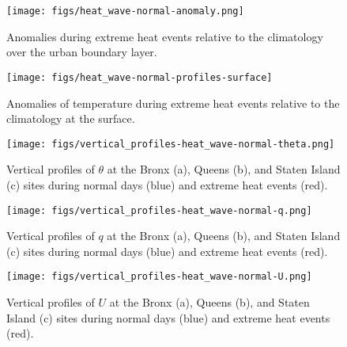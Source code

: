 \documentclass[11pt,a4paper]{article}
\begin{document}
\begin{figure}[ht]
	\centering
	\texttt{[image: figs/heat\_wave-normal-anomaly.png]}
	\caption{Anomalies during extreme heat events relative to the climatology over the urban boundary layer.}
	\label{fig:extreme-heat-normal-comparison-contours}
\end{figure}


\begin{figure}[ht]
	\centering
	\texttt{[image: figs/heat\_wave-normal-profiles-surface]}
	\caption{Anomalies of temperature during extreme heat events relative to the climatology at the surface.}
	\label{fig:extreme-heat-normal-comparison-surface}
\end{figure}


\begin{figure}[ht]
	\centering
	\texttt{[image: figs/vertical\_profiles-heat\_wave-normal-theta.png]}
	\caption{Vertical profiles of $\theta$ at the Bronx (a), Queens (b), and Staten Island (c) sites during normal days (blue) and extreme heat events (red).}
	\label{fig:vertical_profiles-heat_wave-normal-theta}
\end{figure}

\begin{figure}[ht]
	\centering
	\texttt{[image: figs/vertical\_profiles-heat\_wave-normal-q.png]}
	\caption{Vertical profiles of $q$ at the Bronx (a), Queens (b), and Staten Island (c) sites during normal days (blue) and extreme heat events (red).}
	\label{fig:vertical_profiles-heat_wave-normal-q}
\end{figure}

\begin{figure}[ht]
	\centering
	\texttt{[image: figs/vertical\_profiles-heat\_wave-normal-U.png]}
	\caption{Vertical profiles of $U$ at the Bronx (a), Queens (b), and Staten Island (c) sites during normal days (blue) and extreme heat events (red).}
	\label{fig:vertical_profiles-heat_wave-normal-U}
\end{figure}


\end{document}
